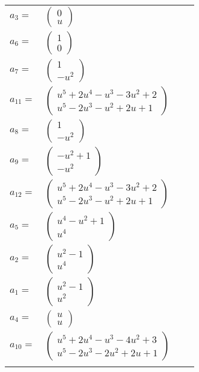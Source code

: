 \documentclass[1p]{elsarticle_modified}
\theoremstyle{definition}
\begin{document}
\begin{tabular}{m{7pt} m{180pt} m{7pt} m{180pt} }
\flushright $a_{3}=$&$\begin{pmatrix}0\\u\end{pmatrix}$ \\
\flushright $a_{6}=$&$\begin{pmatrix}1\\0\end{pmatrix}$ \\
\flushright $a_{7}=$&$\begin{pmatrix}1\\- u^2\end{pmatrix}$ \\
\flushright $a_{11}=$&$\begin{pmatrix}u^5+2 u^4- u^3-3 u^2+2\\u^5-2 u^3- u^2+2 u+1\end{pmatrix}$ \\
\flushright $a_{8}=$&$\begin{pmatrix}1\\- u^2\end{pmatrix}$ \\
\flushright $a_{9}=$&$\begin{pmatrix}- u^2+1\\- u^2\end{pmatrix}$ \\
\flushright $a_{12}=$&$\begin{pmatrix}u^5+2 u^4- u^3-3 u^2+2\\u^5-2 u^3- u^2+2 u+1\end{pmatrix}$ \\
\flushright $a_{5}=$&$\begin{pmatrix}u^4- u^2+1\\u^4\end{pmatrix}$ \\
\flushright $a_{2}=$&$\begin{pmatrix}u^2-1\\u^4\end{pmatrix}$ \\
\flushright $a_{1}=$&$\begin{pmatrix}u^2-1\\u^2\end{pmatrix}$ \\
\flushright $a_{4}=$&$\begin{pmatrix}u\\u\end{pmatrix}$ \\
\flushright $a_{10}=$&$\begin{pmatrix}u^5+2 u^4- u^3-4 u^2+3\\u^5-2 u^3-2 u^2+2 u+1\end{pmatrix}$\\&\end{tabular}
\end{document}

